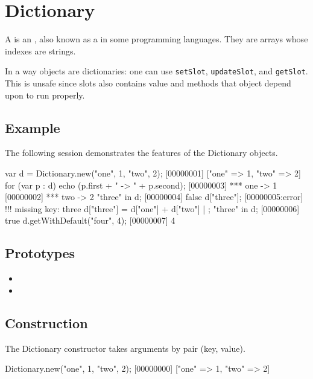 \section{Dictionary}

A  is an , also known as a
 in some programming languages.  They are arrays whose
indexes are strings.

In a way objects are dictionaries: one can use \lstinline|setSlot|,
\lstinline|updateSlot|, and \lstinline|getSlot|.  This is unsafe since
slots also contains value and methods that object depend upon to run
properly.

\subsection{Example}

The following session demonstrates the features of the Dictionary
objects.

\begin{urbiscript}[firstnumber=1]
var d = Dictionary.new("one", 1, "two", 2);
[00000001] ["one" => 1, "two" => 2]
for (var p : d)
  echo (p.first + " -> " + p.second);
[00000003] *** one -> 1
[00000002] *** two -> 2
"three" in d;
[00000004] false
d["three"];
[00000005:error] !!! missing key: three
d["three"] = d["one"] + d["two"] | {};
"three" in d;
[00000006] true
d.getWithDefault("four", 4);
[00000007] 4
\end{urbiscript}

\subsection{Prototypes}

\begin{itemize}
\item {}
\item {}
\end{itemize}

\subsection{Construction}

The Dictionary constructor takes arguments by pair (key, value).

\begin{urbiscript}
Dictionary.new("one", 1, "two", 2);
[00000000] ["one" => 1, "two" => 2]
\end{urbiscript}

